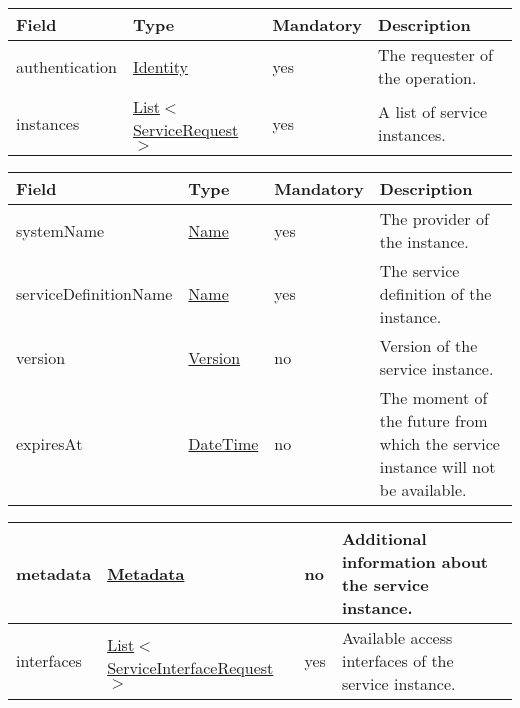 \documentclass[a4paper]{arrowhead}
\newcommand{\pref}[1]{{\textcolor{ArrowheadGrey}{\hyperref[sec:model:primitives:#1]{#1}}}}
\begin{document}
\label{sec:model:ServiceCreateListRequest}
 
\begin{table}[ht!]
\begin{tabularx}{\textwidth}{| p{2.5cm} | p{3.5cm} | p{2cm} | X |} \hline
\rowcolor{gray!33} Field & Type & Mandatory & Description \\ \hline
authentication & \hyperref[sec:model:Identity]{Identity} & yes & The requester of the operation. \\ \hline
instances & \pref{List}$<$\hyperref[sec:model:ServiceRequest]{ServiceRequest}$>$ & yes & A list of service instances. \\ \hline
\end{tabularx}
\end{table}

\label{sec:model:ServiceRequest}
 
\begin{table}[ht!]
\begin{tabularx}{\textwidth}{| p{3.5cm} | p{4.8cm} | p{2cm} | X |} \hline
\rowcolor{gray!33} Field & Type & Mandatory & Description \\ \hline
systemName & \pref{Name} & yes & The provider of the instance. \\ \hline
serviceDefinitionName & \pref{Name} & yes & The service definition of the instance. \\ \hline
version & \pref{Version} & no & Version of the service instance. \\ \hline
expiresAt & \pref{DateTime} & no & The moment of the future from which the service instance will not be available. \\ \hline
\end{tabularx}
\end{table}

\begin{table}[ht!]
\begin{tabularx}{\textwidth}{| p{3.5cm} | p{4.8cm} | p{2cm} | X |} \hline
metadata &\hyperref[sec:model:Metadata]{Metadata} & no & Additional information about the service instance. \\ \hline
interfaces &  \pref{List}$<$\hyperref[sec:model:ServiceInterfaceRequest]{ServiceInterfaceRequest}$>$ & yes & Available access interfaces of the service instance.  \\ \hline
\end{tabularx}
\end{table}
\end{document}
